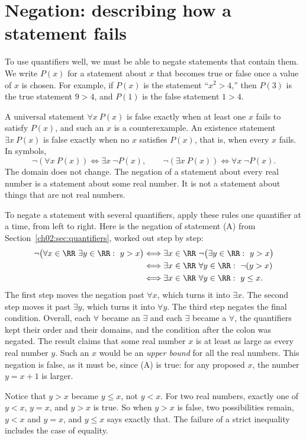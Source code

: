 \section{Negation: describing how a statement fails}\label{ch02:sec:negation}
To use quantifiers well, we must be able to negate statements that contain them. We write $P(x)$ for a statement about $x$ that becomes true or false once a value of $x$ is chosen. For example, if $P(x)$ is the statement ``$x^2>4$,'' then $P(3)$ is the true statement $9>4$, and $P(1)$ is the false statement $1>4$.

A universal statement $\forall x\ P(x)$ is false exactly when at least one $x$ fails to satisfy $P(x)$, and such an $x$ is a counterexample. An existence statement $\exists x\ P(x)$ is false exactly when no $x$ satisfies $P(x)$, that is, when every $x$ fails. In symbols,
\[
\neg(\forall x\ P(x))\Longleftrightarrow\exists x\ \neg P(x),
\qquad
\neg(\exists x\ P(x))\Longleftrightarrow\forall x\ \neg P(x).
\]
The domain does not change. The negation of a statement about every real number is a statement about some real number. It is not a statement about things that are not real numbers.

To negate a statement with several quantifiers, apply these rules one quantifier at a time, from left to right. Here is the negation of statement (A) from Section~\ref{ch02:sec:quantifiers}, worked out step by step:
\begin{align*}
\neg\bigl(\forall x\in\RR\ \exists y\in\RR:\ y>x\bigr)
&\Longleftrightarrow\exists x\in\RR\ \neg\bigl(\exists y\in\RR:\ y>x\bigr)\\
&\Longleftrightarrow\exists x\in\RR\ \forall y\in\RR:\ \neg(y>x)\\
&\Longleftrightarrow\exists x\in\RR\ \forall y\in\RR:\ y\le x.
\end{align*}
The first step moves the negation past $\forall x$, which turns it into $\exists x$. The second step moves it past $\exists y$, which turns it into $\forall y$. The third step negates the final condition. Overall, each $\forall$ became an $\exists$ and each $\exists$ became a $\forall$, the quantifiers kept their order and their domains, and the condition after the colon was negated. The result claims that some real number $x$ is at least as large as every real number $y$. Such an $x$ would be an \emph{upper bound} for all the real numbers. This negation is false, as it must be, since (A) is true: for any proposed $x$, the number $y=x+1$ is larger.

Notice that $y>x$ became $y\le x$, not $y<x$. For two real numbers, exactly one of $y<x$, $y=x$, and $y>x$ is true. So when $y>x$ is false, two possibilities remain, $y<x$ and $y=x$, and $y\le x$ says exactly that. The failure of a strict inequality includes the case of equality.

